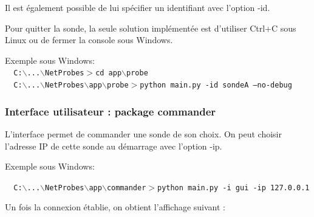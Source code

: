 \documentclass[a4paper,11pt]{article}
\begin{document}
Il est également possible de lui spécifier un identifiant avec l'option -id.

Pour quitter la sonde, la seule solution implémentée est d'utiliser Ctrl+C sous Linux ou de fermer la console sous Windows.

Exemple sous Windows:\\
\texttt{ { \color{blue} C:$\backslash$...$\backslash$NetProbes$>$}cd app$\backslash$probe}\\
\texttt{ { \color{blue} C:$\backslash$...$\backslash$NetProbes$\backslash$app$\backslash$probe$>$}python main.py -id sondeA ---no-debug}


\subsubsection{Interface utilisateur : package commander}
L'interface permet de commander une sonde de son choix. On peut choisir l'adresse IP de cette sonde au démarrage avec l'option -ip.

Exemple sous Windows:
\begin{center}
\texttt{ { \color{blue}C:$\backslash$...$\backslash$NetProbes$\backslash$app$\backslash$commander$>$}python main.py -i gui -ip 127.0.0.1}
\end{center} 
Un fois la connexion établie, on obtient l'affichage suivant :
\end{document}
